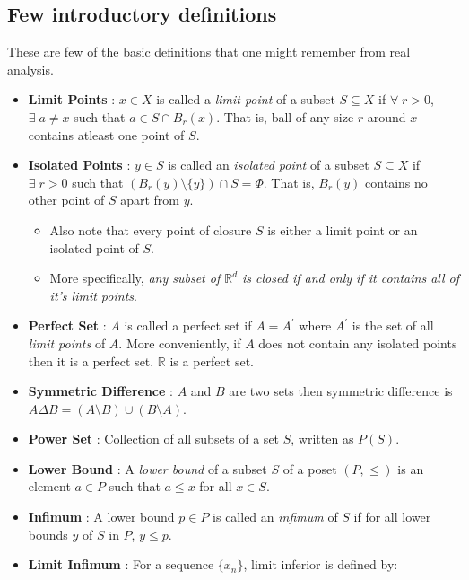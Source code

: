 \documentclass{article}
\theoremstyle{definition}
\theoremstyle{remark}
\theoremstyle{definition}
\theoremstyle{definition}
\theoremstyle{definition}
\newcommand{\intrs}{\cap}
\newcommand{\closure}[1]{\overline{#1}}
\newcommand{\R}{\mathbb{R}}
\begin{document}
\subsection{Few introductory definitions}
These are few of the basic definitions that one might remember from real analysis.
\begin{itemize}
	\item{\textbf{Limit Points} : $ x\in X $ is called a \emph{limit point} of a subset $ S \subseteq X $ if $\forall\; r > 0 $, $ \exists\; a\neq x$ such that $ a\in S\intrs B_{r}(x) $. That is, ball of any size $ r $ around $ x $ contains atleast one point of $ S $.}
	\item{\textbf{Isolated Points} : $ y\in S $ is called an \emph{isolated point} of a subset $ S\subseteq X $ if $ \exists \;r > 0 $ such that $ (B_r(y)\setminus \{y\}) \intrs S = \Phi $. That is, $ B_r(y) $ contains no other point of $ S $ apart from $ y $. \begin{itemize}
			\item {Also note that every point of closure $ \closure{S} $ is either a limit point or an isolated point of $ S $.}
			\item {More specifically, \emph{any subset of $ \R^d $ is closed if and only if it contains all of it's limit points}.}
		\end{itemize} }
	\item{\textbf{Perfect Set} : $ A $ is called a perfect set if $ A = A^\prime $ where $ A^\prime $ is the set of all \emph{limit points} of $ A $. More conveniently, if $ A $ does not contain any isolated points then it is a perfect set. $ \R $ is a perfect set.}
	\item {\textbf{Symmetric Difference} : $ A $ and $ B $ are two sets then symmetric difference is $ A\Delta B = (A\setminus B) \cup (B\setminus A)$.}
	\item {\textbf{Power Set} : Collection of all subsets of a set $ S $, written as $ P(S) $.}
	\item {\textbf{Lower Bound} : 	A \emph{lower bound} of a subset $ S $ of a poset $ (P,\le) $ is an element $ a \in P$ such that $ a\le x $ for all $ x\in S $.}
	\item {\textbf{Infimum} : A lower bound $ p\in P $ is called an \emph{infimum} of $ S $ if for all lower bounds $ y $ of $ S $ in $ P $, $ y\le p $.}
	\item {\textbf{Limit Infimum} : For a sequence $ \{x_n\} $, limit inferior is defined by:
\begin{equation}\label{liminf}

\end{equation}}
\end{itemize}
\end{document}
